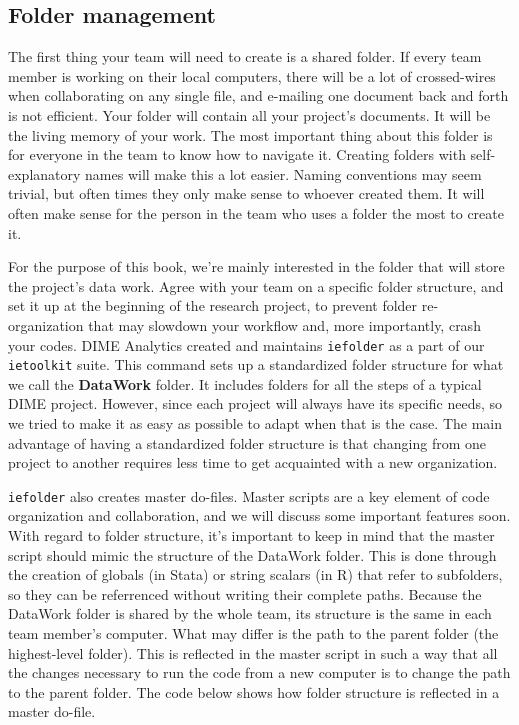 \subsection{Folder management}

The first thing your team will need to create is a shared folder.
If every team member is working on their local computers, 
there will be a lot of crossed-wires when collaborating on any single file,
and e-mailing one document back and forth is not efficient.
Your folder will contain all your project's documents.
It will be the living memory of your work.
The most important thing about this folder is for everyone in the team to know how to navigate it.
Creating folders with self-explanatory names will make this a lot easier. 
Naming conventions may seem trivial, 
but often times they only make sense to whoever created them.
It will often make sense for the person in the team who uses a folder the most to create it.

For the purpose of this book, 
we're mainly interested in the folder that will store the project's data work.
Agree with your team on a specific folder structure, and
set it up at the beginning of the research project,
to prevent folder re-organization that may slowdown your workflow and,
more importantly, crash your codes.
DIME Analytics created and maintains 
\texttt{iefolder} 
as a part of our \texttt{ietoolkit} suite.
This command sets up a standardized folder structure for what we call the \textbf{DataWork} folder.
It includes folders for all the steps of a typical DIME project.
However, since each project will always have its specific needs,
so we tried to make it as easy as possible to adapt when that is the case.
The main advantage of having a standardized folder structure 
is that changing from one project to another requires less 
time to get acquainted with a new organization.

\texttt{iefolder} also creates master do-files.
Master scripts are a key element of code organization and collaboration,
and we will discuss some important features soon.
With regard to folder structure, it's important to keep in mind
that the master script should mimic the structure of the DataWork folder.
This is done through the creation of globals (in Stata) or string scalars (in R) 
that refer to subfolders, 
so they can be referrenced without writing their complete paths.
Because the DataWork folder is shared by the whole team,
its structure is the same in each team member's computer.
What may differ is the path to the parent folder (the highest-level folder).
This is reflected in the master script in such a way that 
all the changes necessary to run the code from a new computer 
is to change the path to the parent folder. 
The code below shows how folder structure is reflected in a master do-file.


